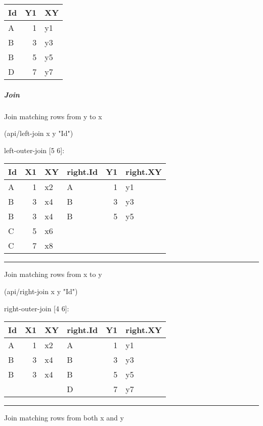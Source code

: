 \documentclass[]{article}
\newenvironment{Shaded}{\begin{snugshade}}{\end{snugshade}}
\newcommand{\StringTok}[1]{\textcolor[rgb]{0.31,0.60,0.02}{#1}}
\newcommand{\NormalTok}[1]{#1}
\let\oldsubparagraph\subparagraph
\renewcommand{\subparagraph}[1]{\oldsubparagraph{#1}\mbox{}}
\begin{document}
\begin{longtable}[]{@{}lrl@{}}
\toprule
Id & Y1 & XY\tabularnewline
\midrule
\endhead
A & 1 & y1\tabularnewline
B & 3 & y3\tabularnewline
B & 5 & y5\tabularnewline
D & 7 & y7\tabularnewline
\bottomrule
\end{longtable}

\subparagraph{Join}\label{join-1}

Join matching rows from y to x

\begin{Shaded}
\begin{Highlighting}[]
\NormalTok{(api/left-join x y }\StringTok{"Id"}\NormalTok{)}
\end{Highlighting}
\end{Shaded}

left-outer-join {[}5 6{]}:

\begin{longtable}[]{@{}lrllrl@{}}
\toprule
Id & X1 & XY & right.Id & Y1 & right.XY\tabularnewline
\midrule
\endhead
A & 1 & x2 & A & 1 & y1\tabularnewline
B & 3 & x4 & B & 3 & y3\tabularnewline
B & 3 & x4 & B & 5 & y5\tabularnewline
C & 5 & x6 & & &\tabularnewline
C & 7 & x8 & & &\tabularnewline
\bottomrule
\end{longtable}

\begin{center}\rule{0.5\linewidth}{0.5pt}\end{center}

Join matching rows from x to y

\begin{Shaded}
\begin{Highlighting}[]
\NormalTok{(api/right-join x y }\StringTok{"Id"}\NormalTok{)}
\end{Highlighting}
\end{Shaded}

right-outer-join {[}4 6{]}:

\begin{longtable}[]{@{}lrllrl@{}}
\toprule
Id & X1 & XY & right.Id & Y1 & right.XY\tabularnewline
\midrule
\endhead
A & 1 & x2 & A & 1 & y1\tabularnewline
B & 3 & x4 & B & 3 & y3\tabularnewline
B & 3 & x4 & B & 5 & y5\tabularnewline
& & & D & 7 & y7\tabularnewline
\bottomrule
\end{longtable}

\begin{center}\rule{0.5\linewidth}{0.5pt}\end{center}

Join matching rows from both x and y
\end{document}
